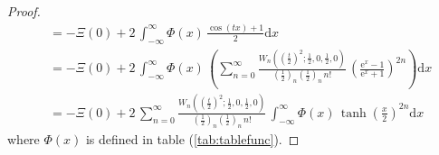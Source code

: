 \documentclass[a4paper,11pt,twoside]{amsart}
\newcommand{\verifiedeq}{=}
\newcommand{\verifiedeq}{\stackrel{\checkmark}{=}}
\begin{document}
\begin{proof}
\begin{align}
  &\verifiedeq -\Xi(0) +2\,\int_{-\infty}^\infty \Phi(x)\, \frac{\cos(tx)+1}{2}  \mathrm{d}x\\
  &\verifiedeq -\Xi(0)+2\,\int_{-\infty}^\infty \Phi(x)\,\left(\sum_{n=0}^\infty \frac{W_n\left(\left(\frac{t}{2}\right)^2;\frac12,0,\frac12,0\right)}{\left(\frac12\right)_n\left(\frac12\right)_n\,n!}\, \left(\frac{\textrm{e}^x-1}{\textrm{e}^x+1}\right)^{2n}\right) \mathrm{d}x \\
  &\verifiedeq -\Xi(0)+2\, \sum_{n=0}^\infty \frac{W_n\left(\left(\frac{t}{2}\right)^2;\frac12,0,\frac12,0\right)}{\left(\frac12\right)_n\left(\frac12\right)_n\,n!}\,\int_{-\infty}^\infty \Phi(x)\,\tanh\left(\frac{x}{2}\right)^{2n} \mathrm{d}x
\end{align}
where $\Phi(x)$ is defined in table (\ref{tab:tablefunc}).
\end{proof}
\end{document}
